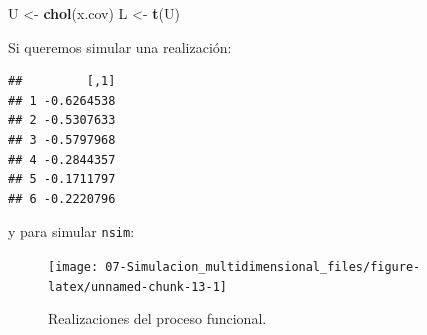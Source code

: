 \documentclass[]{book}
\newenvironment{Shaded}{\begin{snugshade}}{\end{snugshade}}
\newcommand{\KeywordTok}[1]{\textcolor[rgb]{0.13,0.29,0.53}{\textbf{#1}}}
\newcommand{\DataTypeTok}[1]{\textcolor[rgb]{0.13,0.29,0.53}{#1}}
\newcommand{\DecValTok}[1]{\textcolor[rgb]{0.00,0.00,0.81}{#1}}
\newcommand{\FloatTok}[1]{\textcolor[rgb]{0.00,0.00,0.81}{#1}}
\newcommand{\StringTok}[1]{\textcolor[rgb]{0.31,0.60,0.02}{#1}}
\newcommand{\OperatorTok}[1]{\textcolor[rgb]{0.81,0.36,0.00}{\textbf{#1}}}
\newcommand{\NormalTok}[1]{#1}
\theoremstyle{definition}
\theoremstyle{definition}
\theoremstyle{definition}
\theoremstyle{remark}
\begin{document}
\begin{Shaded}
\begin{Highlighting}[]
\NormalTok{U <-}\StringTok{ }\KeywordTok{chol}\NormalTok{(x.cov)}
\NormalTok{L <-}\StringTok{ }\KeywordTok{t}\NormalTok{(U)}
\end{Highlighting}
\end{Shaded}

Si queremos simular una realización:

\begin{Shaded}
\end{Shaded}

\begin{verbatim}
##         [,1]
## 1 -0.6264538
## 2 -0.5307633
## 3 -0.5797968
## 4 -0.2844357
## 5 -0.1711797
## 6 -0.2220796
\end{verbatim}

y para simular \texttt{nsim}:

\begin{Shaded}
\end{Shaded}

\begin{figure}[!htb]

{\centering \texttt{[image: 07-Simulacion\_multidimensional\_files/figure-latex/unnamed-chunk-13-1]} 

}

\caption{Realizaciones del proceso funcional.}\label{fig:unnamed-chunk-13}
\end{figure}
\end{document}

